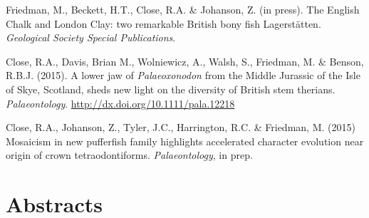 \documentclass[a4paper, oneside, final]{scrartcl} %
\begin{document}
\begin{center}
\begin{flushleft}
\vspace{6pt}

Friedman, M., Beckett, H.T., Close, R.A. \& Johanson, Z. (in press). The English Chalk and London Clay: two remarkable British bony fish Lagerst\"{a}tten. \emph{Geological Society Special Publications}.

\vspace{6pt}

Close, R.A., Davis, Brian M., Wolniewicz, A., Walsh, S., Friedman, M. \& Benson, R.B.J. (2015). A lower jaw of \emph{Palaeoxonodon} from the Middle Jurassic of the Isle of Skye, Scotland, sheds new light on the diversity of British stem therians. \emph{Palaeontology}. \href{http://dx.doi.org/10.1111/pala.12218}{http://dx.doi.org/10.1111/pala.12218}

\vspace{6pt}

Close, R.A., Johanson, Z., Tyler, J.C., Harrington, R.C. \& Friedman, M. (2015) Mosaicism in new pufferfish family highlights accelerated character evolution near origin of crown tetraodontiforms. \emph{Palaeontology}, in prep. 

\vspace{6pt}
%
%
%
%
%
%
%

\end{flushleft}


\section{Abstracts}
\begin{flushleft}


\end{flushleft}
\end{center}
\end{document}

